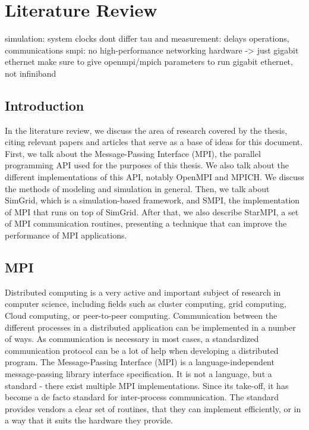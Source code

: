 
\chapter{Literature Review}
\label{Chapter2}

simulation: system clocks dont differ
tau and measurement: delays operations, communications
smpi: no high-performance networking hardware -> just gigabit ethernet
make sure to give openmpi/mpich parameters to run gigabit ethernet,
not infiniband

\section{Introduction}
In the literature review, we discuss the area of research covered by
the thesis, citing relevant papers and articles that serve as a base
of ideas for this document.\\
First, we talk about the Message-Passing Interface (MPI), the parallel
programming API used for the purposes of this thesis. We also talk
about the different implementations of this API, notably OpenMPI and
MPICH. We discuss the methods of modeling and simulation in general.
Then, we talk about SimGrid, which is a simulation-based
framework, and SMPI, the implementation of MPI that runs on top of
SimGrid. After that, we also describe StarMPI, a set of MPI
communication routines, presenting a technique that can improve the
performance of MPI applications.
\section{MPI}
Distributed computing is a very active and important subject of research
in computer science, including fields such as cluster computing, grid
computing, Cloud computing, or peer-to-peer computing. Communication
between the different processes in a distributed application can be
implemented in a number of ways. As communication is necessary in most
cases, a standardized communication protocol can be a lot of help when
developing a distributed program. The Message-Passing Interface (MPI)
is a language-independent message-passing library
interface specification. It is not a language, but a standard - there
exist multiple MPI implementations. Since its take-off, it has become
a de facto standard for inter-process communication. The standard
provides vendors a clear set of routines, that they can implement
efficiently, or in a way that it suits the hardware they
provide.\cite{mpif12}
